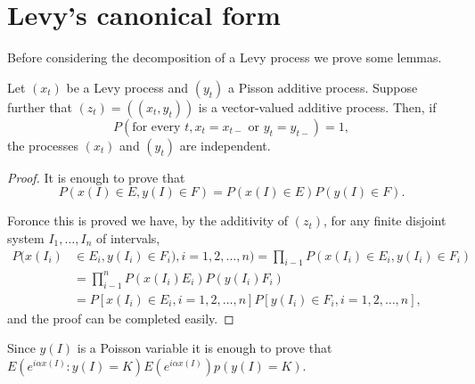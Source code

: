 \section{Levy's canonical form}\label{chap4-sec3}

Before considering the decomposition of a Levy process we prove some lemmas.

\setcounter{theorem}{0}
\begin{Lemma}\label{chap4-sec3-lem1}%
  Let $(x_t)$ be a Levy process and $(y_t)$ a Pisson additive
  process. Suppose further that $(z_t)=((x_t,y_t))$ is a vector-valued
  additive process. Then, if 
  $$
  P(\text{for every }t, x_t = x_{t-}  \text{ or }y_t=y_{t-})=1,
  $$
the processes $(x_t)$ and $(y_t)$ are independent.
\end{Lemma}

\begin{proof}
It is enough to prove that
$$
P(x(I)\in E,y(I)\in F)=P(x(I)\in E) P(y(I)\in F).
$$

For\pageoriginale once this is proved we have, by the additivity of
$(z_t)$, for any 
finite disjoint system $I_1, \ldots ,I_n$ of intervals, 
\begin{align*}
  P(x(I_i)&\in E_i,y(I_i)\in F_i),i=1,2, \ldots ,n) =\prod
  _{i-1}P(x(I_i)\in E_i,y(I_i)\in F_i)\\ 
  &=\prod _{i-1}^n P(x(I_i)E_i)P(y(I_i)F_i)\\
  &= P[x(I_i)\in E_i,i=1,2, \ldots,n]P[y(I_i)\in F_i,i=1,2, \ldots,n],
\end{align*}
and the proof can be completed easily.
\end{proof}

Since $y(I)$ is a Poisson variable it is enough to prove that $E(e^{i
  \alpha x(I)}:y(I)=K)E(e^{i \alpha x(I)})p(y(I)=K)$. 

